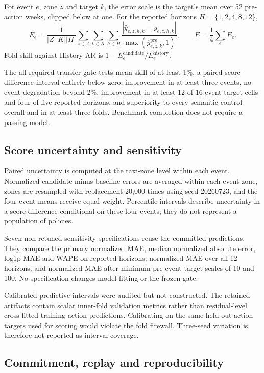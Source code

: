 \documentclass{nature}
\begin{document}
\begin{methods}
For event $e$, zone $z$ and target $k$, the error scale is the target's mean over 52 pre-action weeks, clipped below at one. For the reported horizons $H=\{1,2,4,8,12\}$,
\begin{equation}
E_e=\frac{1}{|Z||K||H|}
\sum_{z\in Z}\sum_{k\in K}\sum_{h\in H}
\frac{|\widehat y_{e,z,h,k}-y_{e,z,h,k}|}
{\max(\overline y^{\mathrm{pre}}_{e,z,k},1)},
\qquad E=\frac{1}{4}\sum_e E_e.
\end{equation}
Fold skill against History AR is $1-E_e^{\mathrm{candidate}}/E_e^{\mathrm{history}}$.

The all-required transfer gate tests mean skill of at least 1\%, a paired score-difference interval entirely below zero, improvement in at least three events, no event degradation beyond 2\%, improvement in at least 12 of 16 event-target cells and four of five reported horizons, and superiority to every semantic control overall and in at least three folds. Benchmark completion does not require a passing model.

\subsection{Score uncertainty and sensitivity}

Paired uncertainty is computed at the taxi-zone level within each event. Normalized candidate-minus-baseline errors are averaged within each event-zone, zones are resampled with replacement 20,000 times using seed 20260723, and the four event means receive equal weight. Percentile intervals describe uncertainty in a score difference conditional on these four events; they do not represent a population of policies.

Seven non-retuned sensitivity specifications reuse the committed predictions. They compare the primary normalized MAE, median normalized absolute error, log1p MAE and WAPE on reported horizons; normalized MAE over all 12 horizons; and normalized MAE after minimum pre-event target scales of 10 and 100. No specification changes model fitting or the frozen gate.

Calibrated predictive intervals were audited but not constructed. The retained artifacts contain scalar inner-fold validation metrics rather than residual-level cross-fitted training-action predictions. Calibrating on the same held-out action targets used for scoring would violate the fold firewall. Three-seed variation is therefore not reported as interval coverage.

\subsection{Commitment, replay and reproducibility}


\end{methods}
\end{document}
